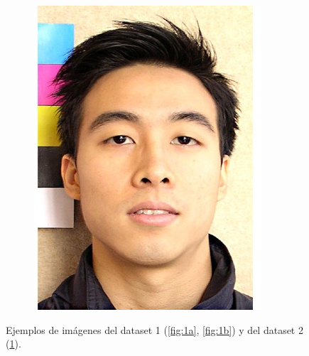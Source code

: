 \begin{figure}[htp]
\begin{subfigure}{0.2\linewidth}
		\includegraphics[width=\linewidth]{imagenes/dataset1-1.jpg}
		\caption{}
		\label{fig:1c}
	\end{subfigure}
	\caption{Ejemplos de imágenes del dataset 1 (\ref{fig:1a}, \ref{fig:1b}) y del dataset 2 (\ref{fig:1c}).}
	\label{fig:1}
\end{figure}


